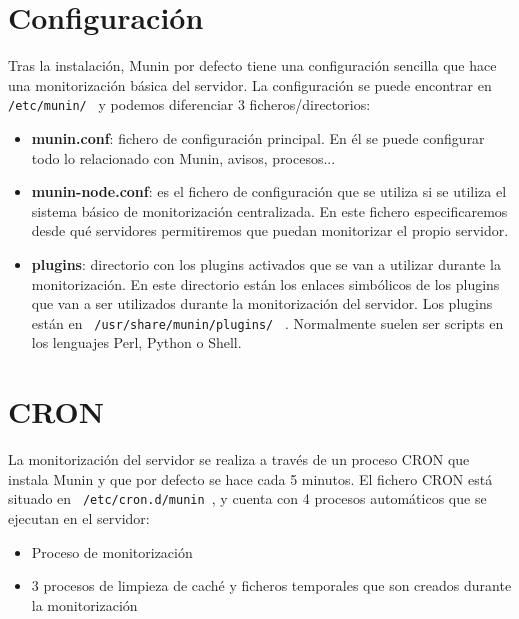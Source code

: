 \section{Configuración}

Tras la instalación, Munin por defecto tiene una configuración sencilla que hace una monitorización básica del servidor. La configuración se puede encontrar en  \texttt{ /etc/munin/ }   y podemos diferenciar 3 ficheros/directorios:

\begin{itemize}
    \item \textbf{munin.conf}: fichero de configuración principal. En él se puede configurar todo lo relacionado con Munin, avisos, procesos...
    \item \textbf{munin-node.conf}: es el fichero de configuración que se utiliza si se utiliza el sistema básico de monitorización centralizada. En este fichero especificaremos desde qué servidores permitiremos que puedan monitorizar el propio servidor.
    \item \textbf{plugins}: directorio con los plugins activados que se van a utilizar durante la monitorización. En este directorio están los enlaces simbólicos de los plugins que van a ser utilizados durante la monitorización del servidor. Los plugins están en  \texttt{ /usr/share/munin/plugins/ }  . Normalmente suelen ser scripts en los lenguajes Perl, Python o Shell.
\end{itemize}

\section{CRON}

La monitorización del servidor se realiza a través de un proceso CRON que instala Munin y que por defecto se hace cada 5 minutos. El fichero CRON está situado en \texttt{ /etc/cron.d/munin }, y cuenta con 4 procesos automáticos que se ejecutan en el servidor:

\begin{itemize}
    \item Proceso de monitorización
    \item 3 procesos de limpieza de caché y ficheros temporales que son creados durante la monitorización
\end{itemize}


\clearpage
